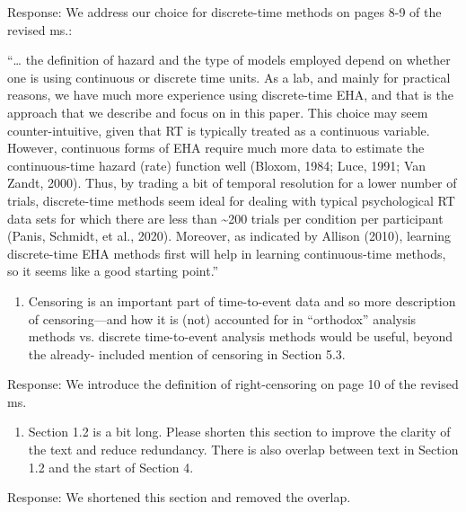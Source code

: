 \documentclass[
]{article}
\providecommand{\tightlist}{%
  \setlength{\itemsep}{0pt}\setlength{\parskip}{0pt}}
\renewenvironment{quote}{\begin{leftbar}}{\end{leftbar}}
\begin{document}
Response: We address our choice for discrete-time methods on pages 8-9
of the revised ms.:

``\ldots{} the definition of hazard and the type of models employed
depend on whether one is using continuous or discrete time units. As a
lab, and mainly for practical reasons, we have much more experience
using discrete-time EHA, and that is the approach that we describe and
focus on in this paper. This choice may seem counter-intuitive, given
that RT is typically treated as a continuous variable. However,
continuous forms of EHA require much more data to estimate the
continuous-time hazard (rate) function well (Bloxom, 1984; Luce, 1991;
Van Zandt, 2000). Thus, by trading a bit of temporal resolution for a
lower number of trials, discrete-time methods seem ideal for dealing
with typical psychological RT data sets for which there are less than
\textasciitilde200 trials per condition per participant (Panis, Schmidt,
et al., 2020). Moreover, as indicated by Allison (2010), learning
discrete-time EHA methods first will help in learning continuous-time
methods, so it seems like a good starting point.''

\begin{quote}
\begin{enumerate}
\def\labelenumi{\arabic{enumi}.}
\setcounter{enumi}{2}
\tightlist
\item
  Censoring is an important part of time-to-event data and so more
  description of censoring---and how it is (not) accounted for in
  ``orthodox'' analysis methods vs. discrete time-to-event analysis
  methods would be useful, beyond the already- included mention of
  censoring in Section 5.3.
\end{enumerate}
\end{quote}

Response: We introduce the definition of right-censoring on page 10 of
the revised ms.

\begin{quote}
\begin{enumerate}
\def\labelenumi{\arabic{enumi}.}
\setcounter{enumi}{3}
\tightlist
\item
  Section 1.2 is a bit long. Please shorten this section to improve the
  clarity of the text and reduce redundancy. There is also overlap
  between text in Section 1.2 and the start of Section 4.
\end{enumerate}
\end{quote}

Response: We shortened this section and removed the overlap.
\end{document}
